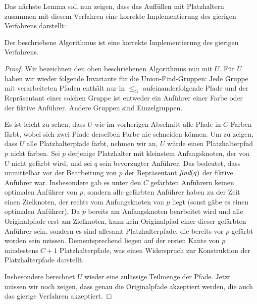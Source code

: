 Das nächste Lemma soll nun zeigen, dass das Auffüllen mit Platzhaltern zusammen mit diesem Verfahren eine korrekte
Implementierung des gierigen Verfahrens darstellt:

\begin{lemma}
    Der beschriebene Algorithmus ist eine korrekte Implementierung des gierigen Verfahrens.
\end{lemma}
\begin{proof}
    Wir bezeichnen den oben beschriebenen Algorithmus nun mit $U$.
    Für $U$ haben wir wieder folgende Invariante für die Union-Find-Gruppen:
    Jede Gruppe mit verarbeiteten Pfaden enthält nur in $\leq_G$ aufeinanderfolgende Pfade und der Repräsentant einer
    solchen Gruppe ist entweder ein Anführer einer Farbe oder der fiktive Anführer.
    Andere Gruppen sind Einzelgruppen.

    Es ist leicht zu sehen, dass $U$ wie im vorherigen Abschnitt alle Pfade in $C$ Farben färbt, wobei sich zwei Pfade
    derselben Farbe nie schneiden können.
    Um zu zeigen, dass $U$ alle Platzhalterpfade färbt, nehmen wir an, $U$ würde einen Platzhalterpfad $p$ nicht färben.
    Sei $p$ derjenige Platzhalter mit kleinstem Anfangsknoten, der von $U$ nicht gefärbt wird, und sei $q$ sein bevorzugter Anführer.
    Das bedeutet, dass unmittelbar vor der Bearbeitung von $p$ der Repräsentant $\text{\em find}(q)$ der fiktive Anführer war.
    Insbesondere gab es unter den $C$ gefärbten Anführern keinen optimalen Anführer von $p$, sondern alle gefärbten Anführer
    haben zu der Zeit einen Zielknoten, der rechts vom Anfangsknoten von $p$ liegt (sonst gäbe es einen optimalen Anführer).
    Da $p$ bereits am Anfangsknoten bearbeitet wird und alle Originalpfade erst am Zielknoten, kann kein Originalpfad einer
    dieser gefärbten Anführer sein, sondern es sind allesamt Platzhalterpfade, die bereits vor $p$ gefärbt worden sein müssen.
    Dementsprechend liegen auf der ersten Kante von $p$ mindestens $C+1$ Platzhalterpfade, was einen Widerspruch zur Konstruktion
    der Platzhalterpfade darstellt.

    Insbesondere berechnet $U$ wieder eine zulässige Teilmenge der Pfade.
    Jetzt müssen wir noch zeigen, dass genau die Originalpfade akzeptiert werden, die auch das gierige Verfahren
    akzeptiert.


\end{proof}
